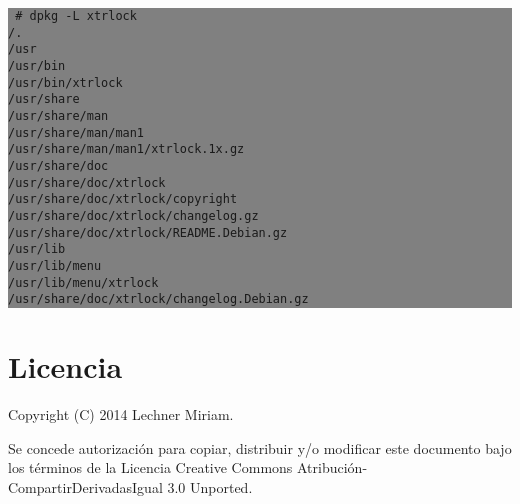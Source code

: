 \documentclass[12pt]{article}
\begin{document}
\colorbox{grey}{\parbox[t]{0.95\linewidth}{ \vspace*{0.5cm} {\tt
\# dpkg -L xtrlock \\
/. \\
/usr \\
/usr/bin \\
/usr/bin/xtrlock \\
/usr/share \\
/usr/share/man \\
/usr/share/man/man1 \\
/usr/share/man/man1/xtrlock.1x.gz \\
/usr/share/doc \\
/usr/share/doc/xtrlock \\
/usr/share/doc/xtrlock/copyright \\
/usr/share/doc/xtrlock/changelog.gz \\
/usr/share/doc/xtrlock/README.Debian.gz \\
/usr/lib \\
/usr/lib/menu \\
/usr/lib/menu/xtrlock \\
/usr/share/doc/xtrlock/changelog.Debian.gz \\
 } \vspace*{0.5cm} } } 



\section*{Licencia}
Copyright (C) 2014 Lechner Miriam.

Se concede autorización para copiar, distribuir y/o modificar este documento
bajo los términos de la Licencia Creative Commons Atribución-CompartirDerivadasIgual 3.0 Unported. 
\end{document}
